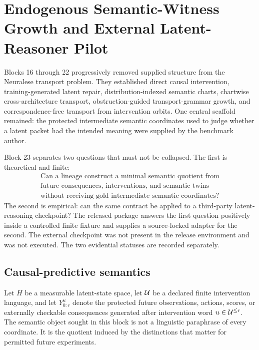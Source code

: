 \section{Endogenous Semantic-Witness Growth and External Latent-Reasoner Pilot}
\label{sec:block23}

Blocks 16 through 22 progressively removed supplied structure from the Neuralese transport problem.  They established direct causal intervention, training-generated latent repair, distribution-indexed semantic charts, chartwise cross-architecture transport, obstruction-guided transport-grammar growth, and correspondence-free transport from intervention orbits.  One central scaffold remained: the protected intermediate semantic coordinates used to judge whether a latent packet had the intended meaning were supplied by the benchmark author.

Block 23 separates two questions that must not be collapsed.  The first is theoretical and finite:
\begin{equation}
\boxed{
\begin{gathered}
\text{Can a lineage construct a minimal semantic quotient from}\\
\text{future consequences, interventions, and semantic twins}\\
\text{without receiving gold intermediate semantic coordinates?}
\end{gathered}}
\label{eq:b23-central-question}
\end{equation}
The second is empirical: can the same contract be applied to a third-party latent-reasoning checkpoint?  The released package answers the first question positively inside a controlled finite fixture and supplies a source-locked adapter for the second.  The external checkpoint was not present in the release environment and was not executed.  The two evidential statuses are recorded separately.

\subsection{Causal-predictive semantics}

Let $H$ be a measurable latent-state space, let $\mathcal U$ be a declared finite intervention language, and let $Y^{u}_{0:r}$ denote the protected future observations, actions, scores, or externally checkable consequences generated after intervention word $u\in\mathcal U^{\le r}$.  The semantic object sought in this block is not a linguistic paraphrase of every coordinate.  It is the quotient induced by the distinctions that matter for permitted future experiments.

